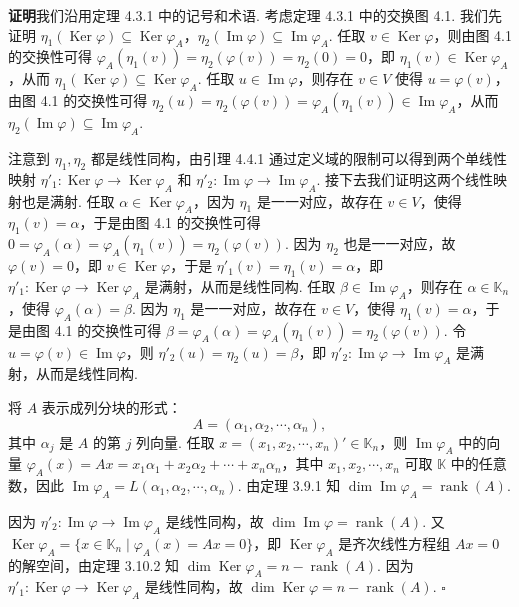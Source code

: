 \documentclass[UTF8, 12pt, fontset=fandol, oneside]{ctexart}
\begin{document}
\noindent\textbf{证明}\quad 我们沿用定理 4.3.1 中的记号和术语. 考虑定理 4.3.1 中的交换图 4.1. 我们先证明 $\eta_1(\operatorname{Ker}\varphi)\subseteq\operatorname{Ker}\varphi_A$，$\eta_2(\operatorname{Im}\varphi)\subseteq\operatorname{Im}\varphi_A$. 任取 $v\in\operatorname{Ker}\varphi$，则由图 4.1 的交换性可得 $\varphi_A(\eta_1(v))=\eta_2(\varphi(v))=\eta_2(0)=0$，即 $\eta_1(v)\in\operatorname{Ker}\varphi_A$，从而 $\eta_1(\operatorname{Ker}\varphi)\subseteq\operatorname{Ker}\varphi_A$. 任取 $u\in\operatorname{Im}\varphi$，则存在 $v\in V$ 使得 $u=\varphi(v)$，由图 4.1 的交换性可得 $\eta_2(u)=\eta_2(\varphi(v))=\varphi_A(\eta_1(v))\in\operatorname{Im}\varphi_A$，从而 $\eta_2(\operatorname{Im}\varphi)\subseteq\operatorname{Im}\varphi_A$.

注意到 $\eta_1,\eta_2$ 都是线性同构，由引理 4.4.1 通过定义域的限制可以得到两个单线性映射 $\eta'_1:\operatorname{Ker}\varphi\to\operatorname{Ker}\varphi_A$ 和 $\eta'_2:\operatorname{Im}\varphi\to\operatorname{Im}\varphi_A$. 接下去我们证明这两个线性映射也是满射. 任取 $\alpha\in\operatorname{Ker}\varphi_A$，因为 $\eta_1$ 是一一对应，故存在 $v\in V$，使得 $\eta_1(v)=\alpha$，于是由图 4.1 的交换性可得 $0=\varphi_A(\alpha)=\varphi_A(\eta_1(v))=\eta_2(\varphi(v))$. 因为 $\eta_2$ 也是一一对应，故 $\varphi(v)=0$，即 $v\in\operatorname{Ker}\varphi$，于是 $\eta'_1(v)=\eta_1(v)=\alpha$，即 $\eta'_1:\operatorname{Ker}\varphi\to\operatorname{Ker}\varphi_A$ 是满射，从而是线性同构. 任取 $\beta\in\operatorname{Im}\varphi_A$，则存在 $\alpha\in\mathbb{K}_n$，使得 $\varphi_A(\alpha)=\beta$. 因为 $\eta_1$ 是一一对应，故存在 $v\in V$，使得 $\eta_1(v)=\alpha$，于是由图 4.1 的交换性可得 $\beta=\varphi_A(\alpha)=\varphi_A(\eta_1(v))=\eta_2(\varphi(v))$. 令 $u=\varphi(v)\in\operatorname{Im}\varphi$，则 $\eta'_2(u)=\eta_2(u)=\beta$，即 $\eta'_2:\operatorname{Im}\varphi\to\operatorname{Im}\varphi_A$ 是满射，从而是线性同构.

将 $A$ 表示成列分块的形式：
\[
A=(\alpha_1,\alpha_2,\cdots,\alpha_n),
\]
其中 $\alpha_j$ 是 $A$ 的第 $j$ 列向量. 任取 $x=(x_1,x_2,\cdots,x_n)'\in\mathbb{K}_n$，则 $\operatorname{Im}\varphi_A$ 中的向量 $\varphi_A(x)=Ax=x_1\alpha_1+x_2\alpha_2+\cdots+x_n\alpha_n$，其中 $x_1,x_2,\cdots,x_n$ 可取 $\mathbb{K}$ 中的任意数，因此 $\operatorname{Im}\varphi_A=L(\alpha_1,\alpha_2,\cdots,\alpha_n)$. 由定理 3.9.1 知 $\dim\operatorname{Im}\varphi_A=\operatorname{rank}(A)$.

因为 $\eta'_2:\operatorname{Im}\varphi\to\operatorname{Im}\varphi_A$ 是线性同构，故 $\dim\operatorname{Im}\varphi=\operatorname{rank}(A)$. 又 $\operatorname{Ker}\varphi_A=\{x\in\mathbb{K}_n\mid \varphi_A(x)=Ax=0\}$，即 $\operatorname{Ker}\varphi_A$ 是齐次线性方程组 $Ax=0$ 的解空间，由定理 3.10.2 知 $\dim\operatorname{Ker}\varphi_A=n-\operatorname{rank}(A)$. 因为 $\eta'_1:\operatorname{Ker}\varphi\to\operatorname{Ker}\varphi_A$ 是线性同构，故 $\dim\operatorname{Ker}\varphi=n-\operatorname{rank}(A)$. $\square$
\end{document}
